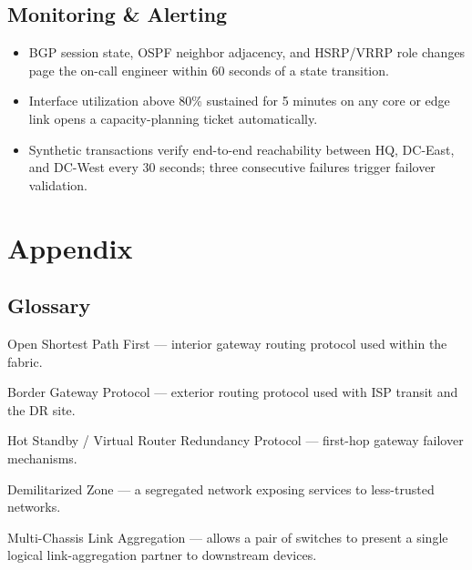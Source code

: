 \documentclass[11pt,a4paper]{report}
\begin{document}
\section{Monitoring \& Alerting}
\begin{itemize}[leftmargin=1.4em]
  \item BGP session state, OSPF neighbor adjacency, and HSRP/VRRP role changes page the
    on-call engineer within 60 seconds of a state transition.
  \item Interface utilization above 80\% sustained for 5 minutes on any core or edge link
    opens a capacity-planning ticket automatically.
  \item Synthetic transactions verify end-to-end reachability between HQ, DC-East, and
    DC-West every 30 seconds; three consecutive failures trigger failover validation.
\end{itemize}

\chapter{Appendix}

\section{Glossary}
\begin{description}[leftmargin=3.2em, style=nextline]
  \item[OSPF] Open Shortest Path First --- interior gateway routing protocol used within
    the fabric.
  \item[BGP] Border Gateway Protocol --- exterior routing protocol used with ISP transit
    and the DR site.
  \item[HSRP / VRRP] Hot Standby / Virtual Router Redundancy Protocol --- first-hop gateway
    failover mechanisms.
  \item[DMZ] Demilitarized Zone --- a segregated network exposing services to less-trusted
    networks.
  \item[MLAG] Multi-Chassis Link Aggregation --- allows a pair of switches to present a
    single logical link-aggregation partner to downstream devices.
\end{description}
\end{document}
